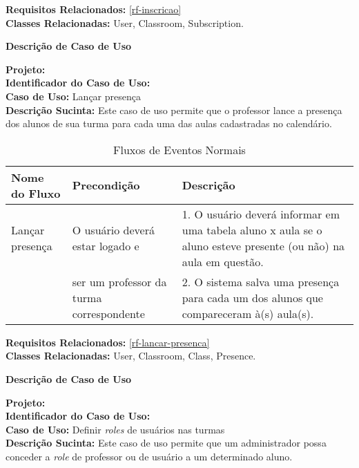 \noindent  \textbf{Requisitos Relacionados:} \ref{rf-inscricao}       \\ \textbf{Classes Relacionadas:} User, Classroom, Subscription.

\newpage
\clearpage
\begin{flushright}    \textbf{Descrição de Caso de Uso}   \end{flushright}         
\noindent \textbf{Projeto:} \imprimirtitulo  \\
\textbf{Identificador do Caso de Uso:} \UC\label{uc-lancar-presenca} \\
\textbf{Caso de Uso:} Lançar presença \\
\noindent \textbf{Descrição Sucinta:} Este caso de uso permite que o professor lance a presença dos alunos de sua turma para cada uma das aulas cadastradas no calendário.\\

\begin{table}[H]
	\centering \vspace{0.5cm} \footnotesize
	\caption{Fluxos de Eventos Normais}
	\begin{tabular}{|p{2.3cm}|p{2.5cm}|p{10cm}|} \hline  \rowcolor[rgb]{0.8,0.8,0.8}
		
		Nome do Fluxo & Precondição & Descrição  \\ \hline		
		
		Lançar presença & O usuário  deverá estar logado e& 1. O usuário deverá informar em uma tabela aluno x aula se o aluno esteve presente (ou não) na aula em questão.  \\
		{} & ser um professor da turma correspondente & 2. O sistema salva uma presença para cada um dos alunos que compareceram à(s) aula(s).\\ \hline
		
		
	\end{tabular}
\end{table}


\noindent  \textbf{Requisitos Relacionados:} \ref{rf-lancar-presenca}       \\ \textbf{Classes Relacionadas:} User, Classroom, Class, Presence.

\newpage
\clearpage
\begin{flushright}    \textbf{Descrição de Caso de Uso}   \end{flushright}         
\noindent \textbf{Projeto:} \imprimirtitulo  \\
\textbf{Identificador do Caso de Uso:} \UC\label{uc-definir-roles} \\
\textbf{Caso de Uso:} Definir \textit{roles} de usuários nas turmas \\
\noindent \textbf{Descrição Sucinta:} Este caso de uso permite que um administrador possa conceder a \textit{role} de professor ou de usuário a um determinado aluno.\\

